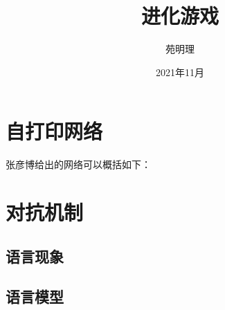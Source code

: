 \documentclass[a4paper,12pt]{article}
\title{进化游戏}
\author{苑明理}
\date{2021年11月}
\begin{document}
\maketitle{}

\section{自打印网络}

张彦博给出的网络可以概括如下：



\section{对抗机制}

\subsection{语言现象}

\subsection{语言模型}
\end{document}
